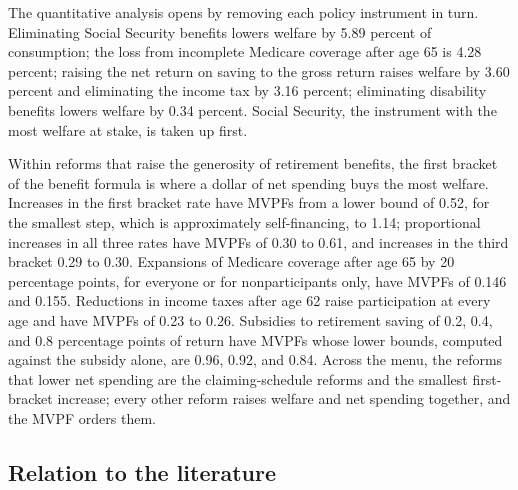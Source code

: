The quantitative analysis opens by removing each policy instrument in turn. Eliminating Social Security benefits lowers welfare by 5.89 percent of consumption; the loss from incomplete Medicare coverage after age 65 is 4.28 percent; raising the net return on saving to the gross return raises welfare by 3.60 percent and eliminating the income tax by 3.16 percent; eliminating disability benefits lowers welfare by 0.34 percent. %
Social Security, the instrument with the most welfare at stake, is taken up first.

Within reforms that raise the generosity of retirement benefits, the first bracket of the benefit formula is where a dollar of net spending buys the most welfare. Increases in the first bracket rate have MVPFs from a lower bound of 0.52, for the smallest step, which is approximately self-financing, to 1.14; proportional increases in all three rates have MVPFs of 0.30 to 0.61, and increases in the third bracket 0.29 to 0.30. %
Expansions of Medicare coverage after age 65 by 20 percentage points, for everyone or for nonparticipants only, have MVPFs of 0.146 and 0.155. %
Reductions in income taxes after age 62 raise participation at every age and have MVPFs of 0.23 to 0.26. %
Subsidies to retirement saving of 0.2, 0.4, and 0.8 percentage points of return have MVPFs whose lower bounds, computed against the subsidy alone, are 0.96, 0.92, and 0.84. %
Across the menu, the reforms that lower net spending are the claiming-schedule reforms and the smallest first-bracket increase; every other reform raises welfare and net spending together, and the MVPF orders them. %

\subsection{Relation to the literature}\label{subsec:literature}

